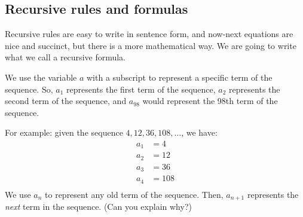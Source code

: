%
%
%
%

\subsection{Recursive rules and formulas}

Recursive rules are easy to write in sentence form, and now-next equations are nice and succinct, but there is a more mathematical way. We are going to write what we call a recursive formula.
 
We use the variable $a$ with a subscript to represent a specific term of the sequence. So, $a_1$ represents the first term of the sequence, $a_2$ represents the second term of the sequence, and $a_{98}$ would represent the 98th term of the sequence.

For example: given the sequence $4, 12, 36, 108, \dotsc$, we have: \[
\begin{aligned}
a_1 &= 4\\
a_2 &= 12\\
a_3 &= 36\\
a_4 &= 108\\
\end{aligned}\]
We use $a_n$ to represent any old term of the sequence. Then, $a_{n+1}$ represents the \textit{next} term in the sequence. (Can you explain why?)


